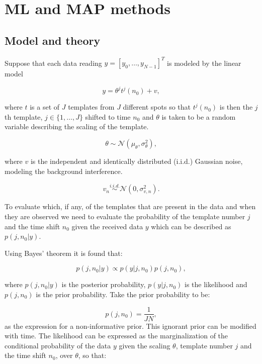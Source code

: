 \section{ML and MAP methods}
\subsection{Model and theory}
Suppose that each data reading $y = [y_0, \ldots , y_{N-1}]^T $ is modeled by the linear model

\begin{equation}\label{eq:MLmod1}
y = \theta^j t^j(n_0) + v,
\end{equation}

where $t$ is a set of $J$ templates from $J$ different spots so that $t^j(n_0)$ is then the $j$th template, $j \in \{1, \ldots ,J\}$ shifted to time $n_0$ and $\theta$ is taken to be a random variable describing the scaling of the template.

\begin{equation}\label{eq:MLtheta}
\theta \sim \mathcal{N}(\mu_{\theta},\sigma_{\theta}^2),
\end{equation}

where $v$ is the independent and identically distributed (i.i.d.) Gaussian noise, modeling the background interference.

\begin{equation}\label{eq:MLnoise}
v_n \stackrel{i.i.d.}{\sim} \mathcal{N}(0,\sigma_{v,n}^2).
\end{equation}

To evaluate which, if any, of the templates that are present in the data and when they are observed we need to evaluate the probability of the template number $j$ and the time shift $n_0$ given the received data $y$ which can be described as $p(j,n_0|y)$.

Using Bayes' theorem it is found that:

\begin{equation}\label{eq:MLBayes}
p(j,n_0|y) \propto p(y|j,n_0)p(j,n_0),
\end{equation}

where $p(j,n_0|y)$ is the posterior probability, $p(y|j,n_0)$ is the likelihood and $p(j,n_0)$ is the prior probability.
Take the prior probability to be:

\begin{equation}\label{eq:MLPrior}
p(j,n_0) = \frac{1}{JN},
\end{equation}
as the expression for a non-informative prior. This ignorant prior can be modified with time.
The likelihood can be expressed as the marginalization of the conditional probability of the data $y$ given the scaling $\theta$, template number $j$ and the time shift $n_0$, over $\theta$, so that:

